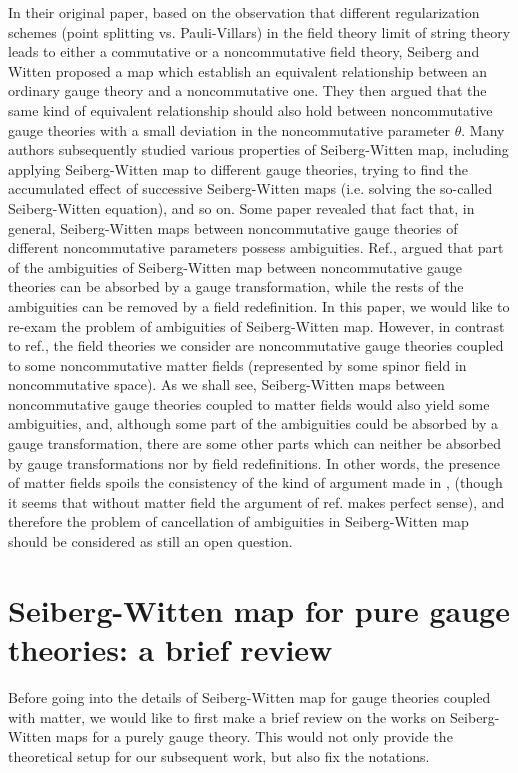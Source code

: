 \documentclass[a4paper,a4paper]{article}%
\begin{document}
In their original paper\cite{6}, based on the observation that different
regularization schemes (point splitting vs. Pauli-Villars) in the field theory
limit of string theory leads to either a commutative or a noncommutative field
theory, Seiberg and Witten proposed a map which establish an equivalent
relationship between an ordinary gauge theory and a noncommutative one. They
then argued that the same kind of equivalent relationship should also hold
between noncommutative gauge theories with a small deviation in the
noncommutative parameter $\theta$. Many authors subsequently studied various
properties of Seiberg-Witten map\cite{7,8,9,10}, including applying
Seiberg-Witten map to different gauge theories, trying to find the accumulated
effect of successive Seiberg-Witten maps (i.e. solving the so-called
Seiberg-Witten equation)\cite{11,12}, and so on. Some paper revealed that fact
that, in general, Seiberg-Witten maps between noncommutative gauge theories of
different noncommutative parameters possess ambiguities. Ref.\cite{13}, argued
that part of the ambiguities of Seiberg-Witten map between noncommutative
gauge theories can be absorbed by a gauge transformation, while the rests of
the ambiguities can be removed by a field redefinition. In this paper, we
would like to re-exam the problem of ambiguities of Seiberg-Witten map.
However, in contrast to ref.\cite{13}, the field theories we consider are
noncommutative gauge theories coupled to some noncommutative matter fields
(represented by some spinor field in noncommutative space). As we shall see,
Seiberg-Witten maps between noncommutative gauge theories coupled to matter
fields would also yield some ambiguities, and, although some part of the
ambiguities could be absorbed by a gauge transformation, there are some other
parts which can neither be absorbed by gauge transformations nor by field
redefinitions. In other words, the presence of matter fields spoils the
consistency of the kind of argument made in \cite{13}, (though it seems that
without matter field the argument of ref. \cite{13} makes perfect sense), and
therefore the problem of cancellation of ambiguities in Seiberg-Witten map
should be considered as still an open question.

\section{Seiberg-Witten map for pure gauge theories: a brief review}

Before going into the details of Seiberg-Witten map for gauge theories coupled
with matter, we would like to first make a brief review on the works on
Seiberg-Witten maps for a purely gauge theory. This would not only provide the
theoretical setup for our subsequent work, but also fix the notations.
\end{document}
